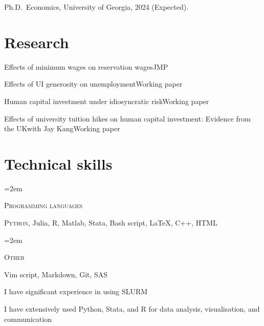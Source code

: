 \documentclass[letterpaper]{article}
\newcommand{\skill}[2]{
  \noindent\hangindent=2em\hangafter=0
  \parbox{3\spacebox}{%
  \textsc{#1}} %
  \hfill
  #2 \par
}%
\newlength{\spacebox}
\renewenvironment{itemize}{
  \begin{list}{}{
    \setlength{\leftmargin}{1.5em}
  }
}{
  \end{list}
}
\begin{document}
\begin{itemize}
  \item Ph.D.\ Economics, University of Georgia, 2024 (Expected).





		
\end{itemize}

\section*{Research}
\begin{itemize}
  \item{Effects of minimum wages on reservation wages}{}{JMP}
  \item{Effects of UI generosity on unemployment}{}{Working paper}
  \item{Human capital investment under idiosyncratic risk}{}{Working paper}
  \item{Effects of university tuition hikes on human capital investment: Evidence from the UK}{with Jay Kang}{Working paper}
\end{itemize}

\section*{Technical skills}
\skill{Programming languages}{\textsc{Python}, Julia, R, Matlab, Stata, Bash script, \LaTeX, \textsc{C++}, HTML}
\skill{Other}{Vim script, Markdown, Git, SAS }
\begin{itemize}
  \item I have significant experience in using \textsc{SLURM}
    \item I have extensively used Python, Stata, and R for data analysis, visualisation, and communication
\end{itemize}
\end{document}
